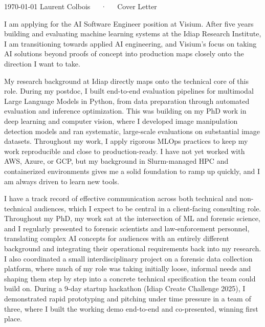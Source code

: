 \documentclass[11pt, a4paper]{awesome-cv}
\begin{document}
\makecvheader[R]

\makecvfooter
  {\today}
  {Laurent Colbois~~~·~~~Cover Letter}
  {}

\makelettertitle

\begin{cvletter}
I am applying for the AI Software Engineer position at Visium. After five years building and evaluating machine learning systems at the Idiap Research Institute, I am transitioning towards applied AI engineering, and Visium's focus on taking AI solutions beyond proofs of concept into production maps closely onto the direction I want to take.

My research background at Idiap directly maps onto the technical core of this role. During my postdoc, I built end-to-end evaluation pipelines for multimodal Large Language Models in Python, from data preparation through automated evaluation and inference optimization. This was building on my PhD work in deep learning and computer vision, where I developed image manipulation detection models and ran systematic, large-scale evaluations on substantial image datasets. Throughout my work, I apply rigorous MLOps practices to keep my work reproducible and close to production-ready. I have not yet worked with AWS, Azure, or GCP, but my background in Slurm-managed HPC and containerized environments gives me a solid foundation to ramp up quickly, and I am always driven to learn new tools.

I have a track record of effective communication across both technical and non-technical audiences, which I expect to be central in a client-facing consulting role. Throughout my PhD, my work sat at the intersection of ML and forensic science, and I regularly presented to forensic scientists and law-enforcement personnel, translating complex AI concepts for audiences with an entirely different background and integrating their operational requirements back into my research. I also coordinated a small interdisciplinary project on a forensic data collection platform, where much of my role was taking initially loose, informal needs and shaping them step by step into a concrete technical specification the team could build on. During a 9-day startup hackathon (Idiap Create Challenge 2025), I demonstrated rapid prototyping and pitching under time pressure  in a team of three, where I built the working demo end-to-end and co-presented, winning first place.


\end{cvletter}
\end{document}
